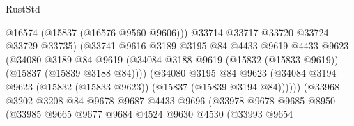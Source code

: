 \begin{lexlean}{RustStd}
\begin{coremodule}
                                        @16574
                                        (@15837 (@16576 @9560 @9606)))
                                      @33714
                                      @33717
                                      @33720
                                      @33724
                                      @33729
                                      @33735)
                                    (@33741
                                      @9616
                                      @3189
                                      @3195
                                      @84
                                      @4433
                                      @9619
                                      @4433
                                      @9623
                                      (@34080
                                        @3189
                                        @84
                                        @9619
                                        (@34084
                                          @3188
                                          @9619
                                          (@15832 (@15833 @9619))
                                          (@15837 (@15839 @3188 @84))))
                                      (@34080
                                        @3195
                                        @84
                                        @9623
                                        (@34084
                                          @3194
                                          @9623
                                          (@15832 (@15833 @9623))
                                          (@15837 (@15839 @3194 @84))))))
                                  (@33968
                                    @3202
                                    @3208
                                    @84
                                    @9678
                                    @9687
                                    @4433
                                    @9696
                                    (@33978
                                      @9678
                                      @9685
                                      @8950
                                      (@33985
                                        @9665
                                        @9677
                                        @9684
                                        @4524
                                        @9630
                                        @4530
                                        (@33993
                                          @9654

\end{coremodule}
\end{lexlean}
